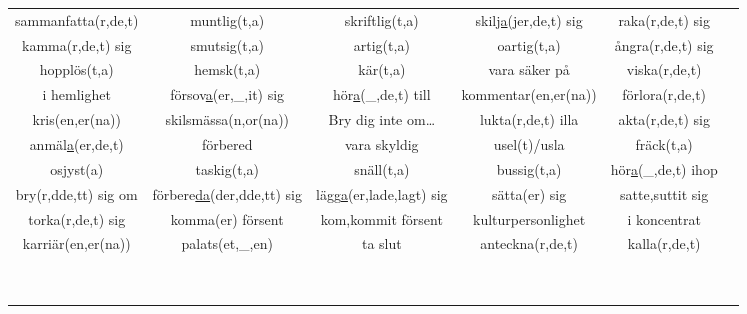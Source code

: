 \begin{center}
\begin{adjustwidth}{-2.5cm}{}
\begin{tabular}{|c c c c c c|}
            sammanfatta(r,de,t) & muntlig(t,a) & skriftlig(t,a) & skil\underline{ja}(jer,de,t) sig & raka(r,de,t) sig &  \\
            kamma(r,de,t) sig & smutsig(t,a) & artig(t,a) & oartig(t,a) & ångra(r,de,t) sig &  \\
            hopplös(t,a) & hemsk(t,a) & kär(t,a) & vara säker på & viska(r,de,t) &  \\
            i hemlighet & försov\underline{a}(er,\_,it) sig & hör\underline{a}(\_,de,t) till & kommentar(en,er(na)) & förlora(r,de,t) &  \\
            kris(en,er(na)) & skilsmässa(n,or(na)) & Bry dig inte om\ldots & lukta(r,de,t) illa & akta(r,de,t) sig &  \\
            anmäl\underline{a}(er,de,t) & förbered & vara skyldig & usel(t)/usla & fräck(t,a) &  \\
            osjyst(a) & taskig(t,a) & snäll(t,a) & bussig(t,a) & hör\underline{a}(\_,de,t) ihop &  \\
            bry(r,dde,tt) sig om & förbere\underline{da}(der,dde,tt) sig & lägg\underline{a}(er,lade,lagt) sig & sätta(er) sig & satte,suttit sig &  \\
            torka(r,de,t) sig & komma(er) försent & kom,kommit försent & kulturpersonlighet & i koncentrat &  \\
            karriär(en,er(na)) & palats(et,\_,en) & ta slut & anteckna(r,de,t) & kalla(r,de,t) &  \\
             &  &  &  &  &  \\
             &  &  &  &  &  \\
             &  &  &  &  &  \\
             &  &  &  &  &  \\
             &  &  &  &  &  \\
             &  &  &  &  &  \\
             &  &  &  &  &  \\
             &  &  &  &  &  \\
             &  &  &  &  &  \\
            \hline
        \end{tabular}
    \end{adjustwidth}
\end{center}

